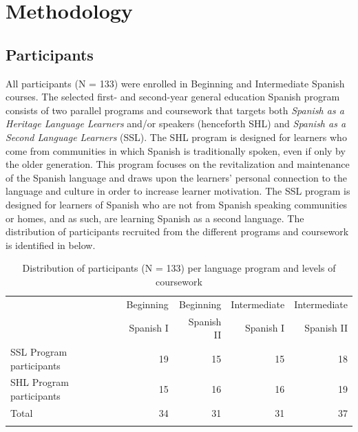 \documentclass[output=paper]{langscibook}
\begin{document}
\section{{Methodology}}

\subsection{Participants}

 All participants (N = 133) were enrolled in Beginning and Intermediate Spanish courses. The selected first- and second-year general education Spanish program consists of two parallel programs and coursework that targets both \textit{Spanish as a Heritage Language Learners} and/or speakers (henceforth SHL) and \textit{Spanish as a Second Language Learners} (SSL). The SHL program is designed for learners who come from communities in which Spanish is traditionally spoken, even if only by the older generation. This program focuses on the revitalization and maintenance of the Spanish language and draws upon the learners’ personal connection to the language and culture in order to increase learner motivation. The SSL program is designed for learners of Spanish who are not from Spanish speaking communities or homes, and as such, are learning Spanish as a second language. The distribution of participants recruited from the different programs and coursework is identified in  below.

\begin{table}
\caption{Distribution of participants (N = 133) per language program and levels of coursework}
\label{tab:3:1}
\begin{tabularx}{\textwidth}{Qrrrr}
\lsptoprule
& Beginning  & Beginning& Intermediate & Intermediate \\
& Spanish I & Spanish II &  Spanish I & Spanish II \\
\midrule
SSL Program participants & 19 & 15 & 15 & 18\\
\tablevspace
SHL Program participants & 15 & 16 & 16 & 19\\
\midrule
Total & 34 & 31 & 31 & 37\\
\lspbottomrule
\end{tabularx}
\end{table}
\end{document}
